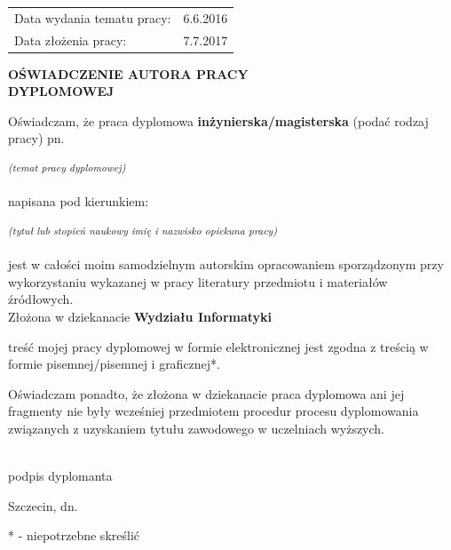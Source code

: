 \documentclass[12pt,a4paper,twoside]{book}
\renewcommand{\headrulewidth}{0pt}
\newcommand{\sigline}[1]{\makebox[\widthof{#1~}]{.\dotfill}\\#1}
\newcommand{\ndots}[1]{\multido{}{#1}{\dots}}
\begin{document}
\vspace{30pt}

\begin{tabular}{ll}
	Data wydania tematu pracy: & 6.6.2016\\
	Data złożenia pracy: & 7.7.2017\\	
\end{tabular}

\pagebreak
\pagestyle{fancy}
\fancyhf{}
\renewcommand{\headrulewidth}{0pt}

\vspace*{70pt}
\begin{center}
	\large{\textbf{\uppercase{OŚWIADCZENIE AUTORA PRACY\\ DYPLOMOWEJ}}}
\end{center}

\vspace{20pt}
\begin{flushleft}
	Oświadczam, że praca dyplomowa \textbf{inżynierska/magisterska }(podać rodzaj pracy) pn.
\end{flushleft}
\dotfill

\noindent\dotfill
\begin{center}
	\textsuperscript{\small{\textit{(temat pracy dyplomowej)}}}
\end{center}
napisana pod kierunkiem:

\noindent\dotfill
\begin{center}
	\textsuperscript{\small{\textit{(tytuł lub stopień naukowy imię i nazwisko opiekuna pracy)}}}
\end{center}

jest w całości moim samodzielnym autorskim opracowaniem sporządzonym przy wykorzystaniu wykazanej w pracy literatury przedmiotu i materiałów źródłowych. \\
Złożona w dziekanacie \textbf{Wydziału Informatyki}

\vspace{20pt}
treść  mojej pracy dyplomowej w formie elektronicznej jest zgodna z treścią w formie pisemnej/pisemnej i graficznej*.

\vspace{20pt}
Oświadczam ponadto, że złożona w dziekanacie praca dyplomowa ani jej fragmenty nie były wcześniej przedmiotem procedur procesu dyplomowania związanych z uzyskaniem tytułu zawodowego w uczelniach wyższych.

\vspace{30pt}
\begin{flushright}
	\noindent%
	\sigline{podpis dyplomanta}
\end{flushright}

\vspace{30pt}
\begin{flushleft}
	Szczecin, dn. \ndots{7}
	
	\vspace{30pt}
	* - niepotrzebne skreślić
\end{flushleft}
\end{document}
